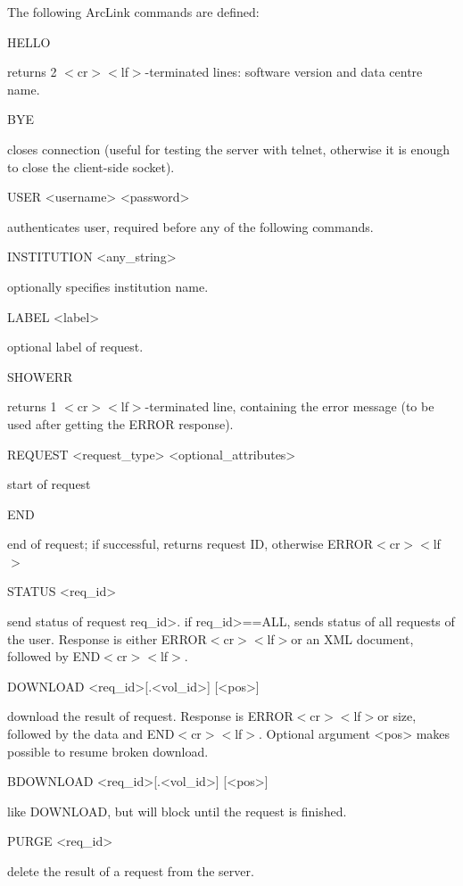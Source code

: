 \documentclass[11pt,a4paper,titlepage]{article}
\let\mylt<
\let\mygt>
\newcommand{\xcr}{$\mylt$cr$\mygt$}
\newcommand{\xlf}{$\mylt$lf$\mygt$}
\begin{document}
The following ArcLink commands are defined:
\begin{interface}

\item HELLO

returns 2 \xcr\xlf-terminated lines: software version and data
centre name.

\item BYE

closes connection (useful for testing the server with telnet, otherwise it
is enough to close the client-side socket).

\item USER <username> <password>

authenticates user, required before any of the following commands.

\item INSTITUTION <any_string>

optionally specifies institution name.

\item LABEL <label>

optional label of request.

\item SHOWERR

returns 1 \xcr\xlf-terminated line, containing the error message
(to be used after getting the ERROR response).

\item REQUEST <request_type> <optional_attributes>

start of request

\item END

end of request; if successful, returns request ID, otherwise
ERROR\xcr\xlf

\item STATUS <req_id>

send status of request \<req_id>. if \<req_id>==ALL, sends status of all
requests of the user. Response is either ERROR\xcr\xlf or an XML
document, followed by END\xcr\xlf.

\item DOWNLOAD <req_id>[.<vol_id>] [<pos>]

download the result of request.  Response is ERROR\xcr\xlf or size,
followed by the data and END\xcr\xlf. Optional argument <pos> makes
possible to resume broken download.

\item BDOWNLOAD <req_id>[.<vol_id>] [<pos>]

like DOWNLOAD, but will block until the request is finished.

\item PURGE <req_id>

delete the result of a request from the server.

\end{interface}
\end{document}
